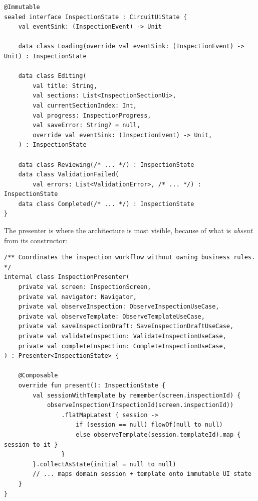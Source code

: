 \documentclass[11pt,a4paper]{article}
\newcommand{\file}[1]{{\small\texttt{#1}}}
\begin{document}
\begin{lstlisting}[caption={\file{feature/inspection/.../InspectionContracts.kt}
(abridged) --- the state machine is explicit and immutable.}]
@Immutable
sealed interface InspectionState : CircuitUiState {
    val eventSink: (InspectionEvent) -> Unit

    data class Loading(override val eventSink: (InspectionEvent) -> Unit) : InspectionState

    data class Editing(
        val title: String,
        val sections: List<InspectionSectionUi>,
        val currentSectionIndex: Int,
        val progress: InspectionProgress,
        val saveError: String? = null,
        override val eventSink: (InspectionEvent) -> Unit,
    ) : InspectionState

    data class Reviewing(/* ... */) : InspectionState
    data class ValidationFailed(
        val errors: List<ValidationError>, /* ... */) : InspectionState
    data class Completed(/* ... */) : InspectionState
}
\end{lstlisting}

The presenter is where the architecture is most visible, because of what is
\emph{absent} from its constructor:

\begin{lstlisting}[caption={\file{feature/inspection/.../InspectionPresenter.kt}
(abridged). Five collaborators, all of them domain use cases. There is no
repository, no DAO, no \texttt{Context}. The comment in the source --- ``Coordinates
the inspection workflow without owning business rules'' --- is enforced by the
module graph, not just asserted.}]
/** Coordinates the inspection workflow without owning business rules. */
internal class InspectionPresenter(
    private val screen: InspectionScreen,
    private val navigator: Navigator,
    private val observeInspection: ObserveInspectionUseCase,
    private val observeTemplate: ObserveTemplateUseCase,
    private val saveInspectionDraft: SaveInspectionDraftUseCase,
    private val validateInspection: ValidateInspectionUseCase,
    private val completeInspection: CompleteInspectionUseCase,
) : Presenter<InspectionState> {

    @Composable
    override fun present(): InspectionState {
        val sessionWithTemplate by remember(screen.inspectionId) {
            observeInspection(InspectionId(screen.inspectionId))
                .flatMapLatest { session ->
                    if (session == null) flowOf(null to null)
                    else observeTemplate(session.templateId).map { session to it }
                }
        }.collectAsState(initial = null to null)
        // ... maps domain session + template onto immutable UI state
    }
}
\end{lstlisting}
\end{document}
